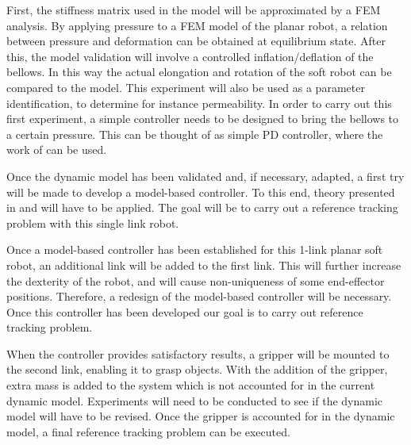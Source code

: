 First, the stiffness matrix used in the model will be approximated by a FEM analysis. By applying pressure to a FEM model of the planar robot, a relation between pressure and deformation can be obtained at equilibrium state. After this, the model validation will involve a controlled inflation/deflation of the bellows. In this way the actual elongation and rotation of the soft robot can be compared to the model. This experiment will also be used as a parameter identification, to determine for instance permeability. In order to carry out this first experiment, a simple controller needs to be designed to bring the bellows to a certain pressure. This can be thought of as simple PD controller, where the work of \cite{proper} can be used.

Once the dynamic model has been validated and, if necessary, adapted, a first try will be made to develop a model-based controller. To this end, theory presented in \cite{della2019exact} and \cite{spong1996energy} will have to be applied. The goal will be to carry out a reference tracking problem with this single link robot.  

Once a model-based controller has been established for this 1-link planar soft robot, an additional link will be added to the first link. This will further increase the dexterity of the robot, and will cause non-uniqueness of some end-effector positions. Therefore, a redesign of the model-based controller will be necessary. Once this controller has been developed our goal is to carry out reference tracking problem. 

When the controller provides satisfactory results, a gripper will be mounted to the second link, enabling it to grasp objects. With the addition of the gripper, extra mass is added to the system which is not accounted for in the current dynamic model. Experiments will need to be conducted to see if the dynamic model will have to be revised. Once the gripper is accounted for in the dynamic model, a final reference tracking problem can be executed.

